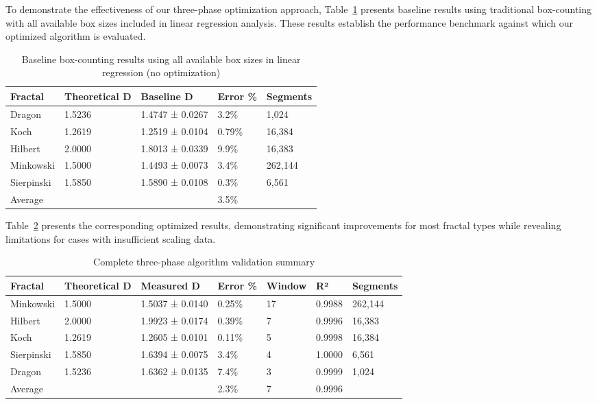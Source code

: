 \documentclass[preprint,12pt]{elsarticle}
\def\textbf#1{#1}%
\begin{document}
To demonstrate the effectiveness of our three-phase optimization approach, Table~\ref{tab:baseline_validation} presents baseline results using traditional box-counting with all available box sizes included in linear regression analysis. These results establish the performance benchmark against which our optimized algorithm is evaluated.

\begin{table}[H]
\centering
\footnotesize
\begin{tabularx}{\textwidth}{@{}lXXXX@{}}
\toprule
\textbf{Fractal} & \textbf{Theoretical D} & \textbf{Baseline D} & \textbf{Error \%} & \textbf{Segments} \\
\midrule
Dragon & 1.5236 & 1.4747 ± 0.0267 & \textbf{3.2\%} & 1,024 \\
Koch & 1.2619 & 1.2519 ± 0.0104 & \textbf{0.79\%} & 16,384 \\
Hilbert & 2.0000 & 1.8013 ± 0.0339 & \textbf{9.9\%} & 16,383 \\
Minkowski & 1.5000 & 1.4493 ± 0.0073 & \textbf{3.4\%} & 262,144 \\
Sierpinski & 1.5850 & 1.5890 ± 0.0108 & \textbf{0.3\%} & 6,561 \\
\midrule
\textbf{Average} & & & \textbf{3.5\%} & \\
\bottomrule
\end{tabularx}
\caption{Baseline box-counting results using all available box sizes in linear regression (no optimization)}
\label{tab:baseline_validation}
\end{table}

Table~\ref{tab:complete_validation} presents the corresponding optimized results, demonstrating significant improvements for most fractal types while revealing limitations for cases with insufficient scaling data.

\begin{table}[H]
\centering
\footnotesize
\begin{tabularx}{\textwidth}{@{}lXXXXXX@{}}
\toprule
\textbf{Fractal} & \textbf{Theoretical D} & \textbf{Measured D} & \textbf{Error \%} & \textbf{Window} & \textbf{R²} & \textbf{Segments} \\
\midrule
Minkowski & 1.5000 & 1.5037 ± 0.0140 & \textbf{0.25\%} & 17 & 0.9988 & 262,144 \\
Hilbert & 2.0000 & 1.9923 ± 0.0174 & \textbf{0.39\%} & 7 & 0.9996 & 16,383 \\
Koch & 1.2619 & 1.2605 ± 0.0101 & \textbf{0.11\%} & 5 & 0.9998 & 16,384 \\
Sierpinski & 1.5850 & 1.6394 ± 0.0075 & \textbf{3.4\%} & 4 & 1.0000 & 6,561 \\
Dragon & 1.5236 & 1.6362 ± 0.0135 & \textbf{7.4\%} & 3 & 0.9999 & 1,024 \\
\midrule
\textbf{Average} & & & \textbf{2.3\%} & \textbf{7} & \textbf{0.9996} & \\\bottomrule
\end{tabularx}
\caption{Complete three-phase algorithm validation summary}
\label{tab:complete_validation}
\end{table}
\end{document}
